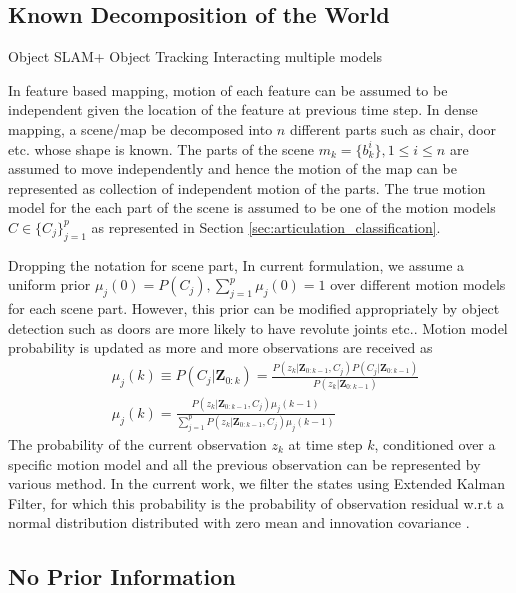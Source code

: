 \documentclass[conference]{IEEEtran}
\begin{document}
\subsection{Known Decomposition of the World} Object SLAM+ Object Tracking Interacting multiple models

In feature based mapping, motion of each feature can be assumed to be independent given the location of the feature at previous time step. In dense mapping, a scene/map be decomposed into $n$ different parts such as chair, door etc. whose shape is known. The parts of the scene $m_k = \{b^i_k\},  1\leq i \leq n$ are assumed to move independently and hence the motion of the map can be represented as collection of independent motion of the parts. The true motion model for the  each part of the scene is assumed to be one of the motion models $C \in \{C_j\}^{p}_{j=1}$ as represented in Section \ref{sec:articulation_classification}. 

Dropping the notation for scene part, In current formulation, we assume a uniform prior $\mu_j(0) = P(C_j), \sum_{j=1}^{p}\mu_j(0) = 1$ over different motion models for each scene part. However, this prior can be modified appropriately by object detection such as doors are more likely to have revolute joints etc.. Motion model probability is updated as more and more observations are received \cite{yaakov2001estimation} as 
\begin{align}
& \mu_j(k) \equiv P(C_j|\mathbf{Z}_{0:k})  = 
\frac{P(z_k|\mathbf{Z}_{0:k-1}, C_j)P(C_j|\mathbf{Z}_{0:k-1})}{P(z_k|\mathbf{Z}_{0:k-1})} \nonumber \\
&\mu_j(k) = \frac{P(z_k|\mathbf{Z}_{0:k-1}, C_j)\mu_j(k-1)}{\sum_{j=1}^{p} P(z_k|\mathbf{Z}_{0:k-1}, C_j)\mu_j(k-1) }
\end{align}
The probability of the current observation $z_k$ at time step $k$, conditioned over a specific motion model and all the previous observation can be represented by various method. In the current work, we filter the states using Extended Kalman Filter, for which this probability is the probability of observation residual w.r.t a normal distribution distributed with zero mean and innovation covariance \cite{yaakov2001estimation}.
\subsection{No Prior Information}
\end{document}
